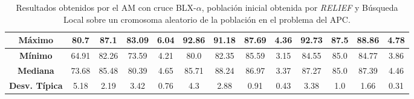 \documentclass[11pt,a4paper]{article}
\begin{document}
\begin{table}[H]
{\begin{tabular}{c|c|c|c|c|c|c|c|c|c|c|c|c|}
\multicolumn{1}{|c|}{\textbf{Máximo}}       & 80.7              & 87.1                    & 83.09         & 6.04       & 92.86             & 91.18          & 87.69         & 4.36       & 92.73             & 87.5           & 88.86         & 4.78       \\ \hline
\multicolumn{1}{|c|}{\textbf{Mínimo}}       & 64.91             & 82.26                   & 73.59         & 4.21       & 80.0              & 82.35          & 85.59         & 3.15       & 84.55             & 85.0           & 84.77         & 3.86       \\ \hline
\multicolumn{1}{|c|}{\textbf{Mediana}}      & 73.68             & 85.48                   & 80.39         & 4.65       & 85.71             & 88.24          & 86.97         & 3.37       & 87.27             & 85.0           & 87.39         & 4.46       \\ \hline
\multicolumn{1}{|c|}{\textbf{Desv. Típica}} & 5.18              & 2.19                    & 3.42          & 0.76       & 4.3               & 2.88           & 0.91          & 0.43       & 3.38              & 1.0            & 1.66          & 0.31       \\ \hline
\end{tabular}
}%
\caption{Resultados obtenidos por el AM con cruce BLX-$\alpha$, población inicial obtenida por \textit{RELIEF} y Búsqueda Local
sobre un cromosoma aleatorio  de la población en el problema del APC.}
\end{table}
\end{document}
